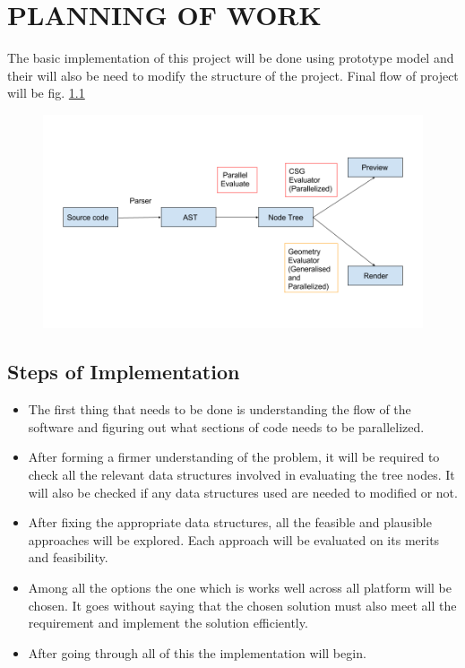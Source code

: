 \chapter{PLANNING OF WORK}

The basic implementation of this project will be done using prototype model and their will also be need to modify the structure of the project. Final flow of project will be fig. \ref{fig:finalflow}

\begin{figure}[H]
\centering
\includegraphics[width=\linewidth]{images/finalflow}
\caption{}
\label{fig:finalflow}
\end{figure}

\section{Steps of Implementation}
\begin{itemize}
	\item The first thing that needs to be done is understanding the flow of the software and figuring out what sections of code needs to be parallelized.
	\item After forming a firmer understanding of the problem, it will be required to check all the relevant data structures involved in evaluating the tree nodes. It will also be checked if any data structures used are needed to modified or not.
	\item After fixing the appropriate data structures, all the feasible and plausible approaches will be explored. Each approach will be evaluated on its merits and feasibility.
	\item Among all the options the one which is works well across all platform will be chosen. It goes without saying that the chosen solution must also meet all the requirement and implement the solution efficiently.
	\item After going through all of this the implementation will begin.
\end{itemize}
